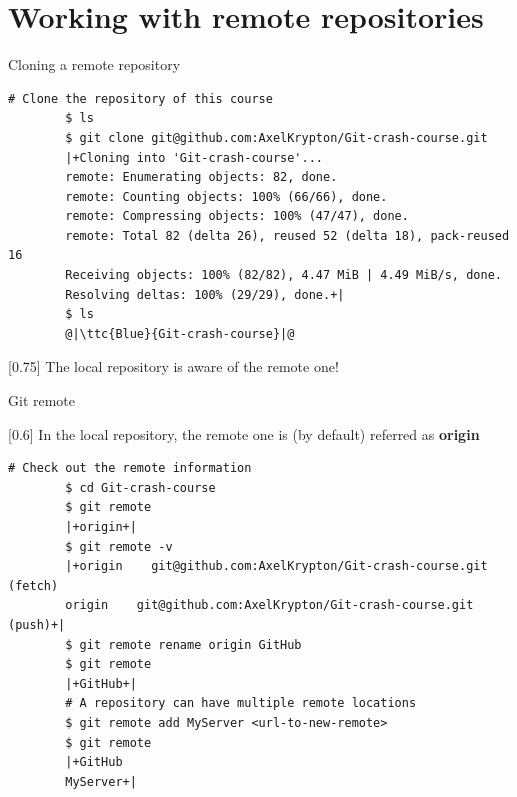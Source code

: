 \documentclass[usenames,svgnames,14pt]{beamer}
\newcommand{\ttc}[2]{\texttt{\textcolor{#1}{#2}}}%
\begin{document}
\section{Working with remote repositories}
\begin{frame}[fragile]{Cloning a remote repository}
    \begin{lstlisting}[style=MyBash, xleftmargin=-1mm, xrightmargin=-1mm]
        # Clone the repository of this course
        $ ls
        $ git clone git@github.com:AxelKrypton/Git-crash-course.git
        |+Cloning into 'Git-crash-course'...
        remote: Enumerating objects: 82, done.
        remote: Counting objects: 100% (66/66), done.
        remote: Compressing objects: 100% (47/47), done.
        remote: Total 82 (delta 26), reused 52 (delta 18), pack-reused 16
        Receiving objects: 100% (82/82), 4.47 MiB | 4.49 MiB/s, done.
        Resolving deltas: 100% (29/29), done.+|
        $ ls
        @|\ttc{Blue}{Git-crash-course}|@
    \end{lstlisting}
    \begin{varblock}{}[0.75\textwidth]{}
        The local repository is aware of the remote one!
    \end{varblock}
\end{frame}
\begin{frame}[fragile]{Git remote}
    \vspace{-3mm}
    \begin{varblock}{}[0.6\textwidth]{}
        In the local repository, the remote one is (by default) referred as \textbf{origin}
    \end{varblock}
    \begin{lstlisting}[style=MyBash, xleftmargin=-1mm, xrightmargin=-1mm]
        # Check out the remote information
        $ cd Git-crash-course
        $ git remote
        |+origin+|
        $ git remote -v
        |+origin    git@github.com:AxelKrypton/Git-crash-course.git (fetch)
        origin    git@github.com:AxelKrypton/Git-crash-course.git (push)+|
        $ git remote rename origin GitHub
        $ git remote
        |+GitHub+|
        # A repository can have multiple remote locations
        $ git remote add MyServer <url-to-new-remote>
        $ git remote
        |+GitHub
        MyServer+|
    \end{lstlisting}
\end{frame}
\end{document}
